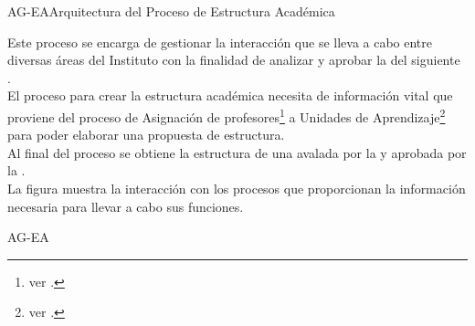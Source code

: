 
\begin{Arquitectura}{AG-EA}{Arquitectura del Proceso de Estructura Académica} {
	Este proceso se encarga de gestionar la interacción que se lleva a cabo entre diversas áreas del Instituto con la finalidad de analizar y aprobar la  del siguiente .\\
	El proceso para crear la estructura académica necesita de información vital que proviene del proceso de Asignación de profesores\footnote{ver .} a Unidades de Aprendizaje\footnote{ver .} para poder elaborar una propuesta de estructura.\\
	Al final del proceso se obtiene la estructura de una  avalada por la  y aprobada por la .\\
		

	La figura  muestra la interacción con los procesos que proporcionan la información necesaria para llevar a cabo sus funciones.
	
	}{AG-EA}

\end{Arquitectura}


